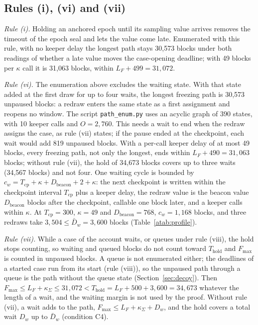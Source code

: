 \documentclass[10pt,a4paper]{article}
\newcommand{\Thold}{T_{\mathrm{hold}}}
\newcommand{\Fmax}{F_{\max}}
\newcommand{\kS}{\kappa_{\Sigma}}
\newcommand{\Dw}{\bar D_w}
\theoremstyle{plain}
\theoremstyle{remark}
\begin{document}
\subsection{Rules (i), (vi) and (vii)}

\emph{Rule (i).} Holding an anchored epoch until its sampling value arrives removes the timeout of the epoch seal and lets the value come late. Enumerated with this rule, with no keeper delay the longest path stays 30,573 blocks under both readings of whether a late value moves the case-opening deadline; with 49 blocks per $\kappa$ call it is 31,063 blocks, within $L_F+499=31{,}072$.

\emph{Rule (vi).} The enumeration above excludes the waiting state. With that state added at the first draw for up to four waits, the longest freezing path is 30,573 unpaused blocks: a redraw enters the same state as a first assignment and reopens no window. The script \texttt{path\_enum.py} uses an acyclic graph of 390 states, with 10 keeper calls and $O=2{,}760$. This needs a wait to end when the redraw assigns the case, as rule (vii) states; if the pause ended at the checkpoint, each wait would add 819 unpaused blocks. With a per-call keeper delay of at most 49 blocks, every freezing path, not only the longest, ends within $L_F+490=31{,}063$ blocks; without rule (vii), the hold of 34,673 blocks covers up to three waits (34,567 blocks) and not four. One waiting cycle is bounded by $c_w=T_{\mathrm{cp}}+\kappa+D_{\mathrm{beacon}}+2+\kappa$: the next checkpoint is written within the checkpoint interval $T_{\mathrm{cp}}$ plus a keeper delay, the redraw value is the beacon value $D_{\mathrm{beacon}}$ blocks after the checkpoint, callable one block later, and a keeper calls within $\kappa$. At $T_{\mathrm{cp}}=300$, $\kappa=49$ and $D_{\mathrm{beacon}}=768$, $c_w=1{,}168$ blocks, and three redraws take $3{,}504\le\Dw=3{,}600$ blocks (Table~\ref{atab:profile}).

\emph{Rule (vii).} While a case of the account waits, or queues under rule (viii), the hold stops counting, so waiting and queued blocks do not count toward $\Thold$ and $\Fmax$ is counted in unpaused blocks. A queue is not enumerated either; the deadlines of a started case run from its start (rule (viii)), so the unpaused path through a queue is the path without the queue state (Section~\ref{sec:decoy}). Then $\Fmax\le L_F+\kS\le31{,}072<\Thold=L_F+500+3{,}600=34{,}673$ whatever the length of a wait, and the waiting margin is not used by the proof. Without rule (vii), a wait adds to the path, $\Fmax\le L_F+\kS+D_w$, and the hold covers a total wait $D_w$ up to $\Dw$ (condition C4).
\end{document}
